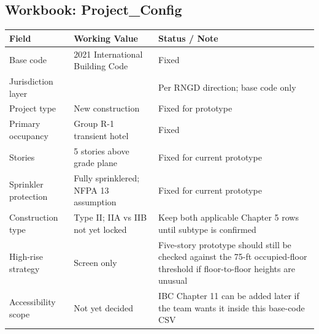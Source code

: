 \documentclass[10pt]{article}
\begin{document}
\subsection{Workbook: Project\_Config}
\begin{longtable}{p{3cm}p{3cm}p{3cm}}
\toprule
Field & Working Value & Status / Note \\ \midrule \endhead
Base code & 2021 International Building Code & Fixed \\
Jurisdiction layer &  & Per RNGD direction; base code only \\
Project type & New construction & Fixed for prototype \\
Primary occupancy & Group R-1 transient hotel & Fixed \\
Stories & 5 stories above grade plane & Fixed for current prototype \\
Sprinkler protection & Fully sprinklered; NFPA 13 assumption & Fixed for current prototype \\
Construction type & Type II; IIA vs IIB not yet locked & Keep both applicable Chapter 5 rows until subtype is confirmed \\
High-rise strategy & Screen only & Five-story prototype should still be checked against the 75-ft occupied-floor threshold if floor-to-floor heights are unusual \\
Accessibility scope & Not yet decided & IBC Chapter 11 can be added later if the team wants it inside this base-code CSV \\
\bottomrule\end{longtable}
\end{document}

